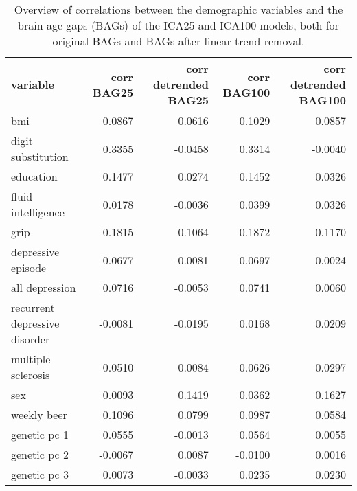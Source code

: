 \begin{table}
\centering
\caption{Overview of correlations between the demographic variables and the brain age gaps (BAGs) of the ICA25 and ICA100 models, both for original BAGs and BAGs after linear trend removal.}
\label{tab: bag correlations}
\begin{tabular}{lrrrr}
\toprule
                     variable &  corr BAG25 &  corr detrended BAG25 &  corr BAG100 &  corr detrended BAG100 \\
\midrule
                          bmi &      0.0867 &                0.0616 &       0.1029 &                 0.0857 \\
           digit substitution &      0.3355 &               -0.0458 &       0.3314 &                -0.0040 \\
                    education &      0.1477 &                0.0274 &       0.1452 &                 0.0326 \\
           fluid intelligence &      0.0178 &               -0.0036 &       0.0399 &                 0.0326 \\
                         grip &      0.1815 &                0.1064 &       0.1872 &                 0.1170 \\
           depressive episode &      0.0677 &               -0.0081 &       0.0697 &                 0.0024 \\
               all depression &      0.0716 &               -0.0053 &       0.0741 &                 0.0060 \\
recurrent depressive disorder &     -0.0081 &               -0.0195 &       0.0168 &                 0.0209 \\
           multiple sclerosis &      0.0510 &                0.0084 &       0.0626 &                 0.0297 \\
                          sex &      0.0093 &                0.1419 &       0.0362 &                 0.1627 \\
                  weekly beer &      0.1096 &                0.0799 &       0.0987 &                 0.0584 \\
                 genetic pc 1 &      0.0555 &               -0.0013 &       0.0564 &                 0.0055 \\
                 genetic pc 2 &     -0.0067 &                0.0087 &      -0.0100 &                 0.0016 \\
                 genetic pc 3 &      0.0073 &               -0.0033 &       0.0235 &                 0.0230 \\
\bottomrule
\end{tabular}
\end{table}
